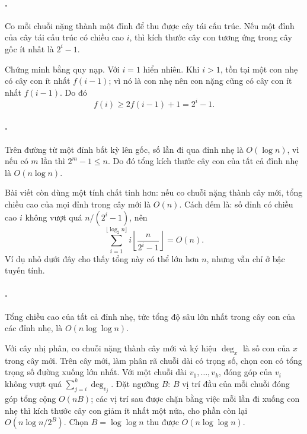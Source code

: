 \documentclass[11pt]{article}
\begin{document}
\paragraph{.}
Co mỗi chuỗi nặng thành một đỉnh để thu được cây tái cấu trúc. Nếu một đỉnh của
cây tái cấu trúc có chiều cao \(i\), thì kích thước cây con tương ứng trong cây
gốc ít nhất là \(2^i-1\).

Chứng minh bằng quy nạp. Với \(i=1\) hiển nhiên. Khi \(i>1\), tồn tại một con
nhẹ có cây con ít nhất \(f(i-1)\); vì nó là con nhẹ nên con nặng cũng có cây
con ít nhất \(f(i-1)\). Do đó
\[
  f(i)\ge 2f(i-1)+1=2^i-1.
\]

\paragraph{.}
Trên đường từ một đỉnh bất kỳ lên gốc, số lần đi qua đỉnh nhẹ là
\(O(\log n)\), vì nếu có \(m\) lần thì \(2^m-1\le n\). Do đó tổng kích thước
cây con của tất cả đỉnh nhẹ là \(O(n\log n)\).

Bài viết còn dùng một tính chất tinh hơn: nếu co chuỗi nặng thành cây mới, tổng
chiều cao của mọi đỉnh trong cây mới là \(O(n)\). Cách đếm là: số đỉnh có chiều
cao \(i\) không vượt quá \(n/(2^i-1)\), nên
\[
  \sum_{i=1}^{\lfloor\log_2 n\rfloor}
  i\left\lfloor\frac{n}{2^i-1}\right\rfloor
  = O(n).
\]
Ví dụ nhỏ dưới đây cho thấy tổng này có thể lớn hơn \(n\), nhưng vẫn chỉ ở bậc
tuyến tính.

\begin{center}
\end{center}

\paragraph{.}
Tổng chiều cao của tất cả đỉnh nhẹ, tức tổng độ sâu lớn nhất trong cây con của
các đỉnh nhẹ, là \(O(n\log\log n)\).

Với cây nhị phân, co chuỗi nặng thành cây mới và ký hiệu \(\deg_x\) là số con
của \(x\) trong cây mới. Trên cây mới, làm phân rã chuỗi dài có trọng số, chọn
con có tổng trọng số đường xuống lớn nhất. Với một chuỗi dài
\(v_1,\ldots,v_k\), đóng góp của \(v_i\) không vượt quá
\(\sum_{j=i}^{k}\deg_{v_j}\). Đặt ngưỡng \(B\): \(B\) vị trí đầu của mỗi chuỗi
đóng góp tổng cộng \(O(nB)\); các vị trí sau được chặn bằng việc mỗi lần đi
xuống con nhẹ thì kích thước cây con giảm ít nhất một nửa, cho phần còn lại
\(O(n\log n/2^B)\). Chọn \(B=\log\log n\) thu được
\(O(n\log\log n)\).
\end{document}
